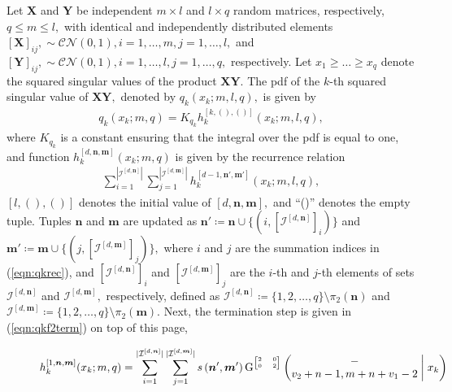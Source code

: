 \begin{theorem}
	\label{thm:qk}
	Let $\boldsymbol{X}$ and $\boldsymbol{Y}$ be independent $m\times l$ and $l\times q$ random matrices, respectively, $q \leq m \leq l,$ with identical and independently distributed elements $[\boldsymbol{X}]_{ij}, \sim \mathcal{CN}(0,1), i=1,\dots,m,j=1,\dots,l,$ and $[\boldsymbol{Y}]_{ij}, \sim \mathcal{CN}(0,1), i=1,\dots,l,j=1,\dots,q,$ respectively. Let $x_1 \geq \dots \geq x_q$ denote the squared singular values of the product $\boldsymbol{X}\boldsymbol{Y}.$ The pdf of the $k$-th squared singular value of $\boldsymbol{X}\boldsymbol{Y},$ denoted by $q_k(x_k; m, l, q),$ is given by
	\begin{align}
		q_k(x_k; m, q) = K_{q_k} h^{[k,(),()]}_k(x_k; m, l, q),
	\end{align}
	where $K_{q_k}$ is a constant ensuring that the integral over the pdf is equal to one, and function $h^{[d,\boldsymbol{n},\boldsymbol{m}]}_k(x_k; m, q)$ is given by the recurrence relation
	\begin{align}
		\sum_{i = 1}^{|{\mathcal{I}}^{[d,\boldsymbol{n}]}|} \sum_{j = 1}^{|{\mathcal{I}}^{[d,\boldsymbol{m}]}|} h^{[d-1,\boldsymbol{n}',\boldsymbol{m}']}_k(x_k; m,l,q), \label{eqn:qkrec}
	\end{align}
	$[l,(),()]$ denotes the initial value of $[d,\boldsymbol{n},\boldsymbol{m}],$ and ``()'' denotes the empty tuple. Tuples $\boldsymbol{n}$ and $\boldsymbol{m}$ are updated as $\boldsymbol{n}' \coloneqq \boldsymbol{n} \cup \{(i,[{\mathcal{I}}^{[d,\boldsymbol{n}]}]_i)\}$ and $\boldsymbol{m}' \coloneqq \boldsymbol{m} \cup \{(j,[{\mathcal{I}}^{[d,\boldsymbol{m}]}]_j)\},$ where $i$ and $j$ are the summation indices in (\ref{eqn:qkrec}), and $[{\mathcal{I}}^{[d,\boldsymbol{n}]}]_i$ and $[{\mathcal{I}}^{[d,\boldsymbol{m}]}]_j$ are the $i$-th and $j$-th elements of sets ${\mathcal{I}}^{[d, \boldsymbol{n}]}$ and ${\mathcal{I}}^{[d, \boldsymbol{m}]},$ respectively, defined as ${\mathcal{I}}^{[d,\boldsymbol{n}]} \coloneqq \{1,2,\dots,q\} \setminus \pi_2(\boldsymbol{n})$ and ${\mathcal{I}}^{[d,\boldsymbol{m}]} \coloneqq \{1,2,\dots,q\} \setminus \pi_2(\boldsymbol{m}).$ Next, the termination step is given in (\ref{eqn:qkf2term}) on top of this page,
	\begin{figure*}
		\begin{align}
			h^{[1,\boldsymbol{n},\boldsymbol{m}]}_k(x_k; m, q) &= \sum_{i = 1}^{|{\mathcal{I}}^{[d,\boldsymbol{n}]}|} \sum_{j = 1}^{|{\mathcal{I}}^{[d,\boldsymbol{m}]}|} s\left(\boldsymbol{n}',\boldsymbol{m}'\right)
			\G{2}{0}{0}{2}{-}{v_2+n-1, m+n+v_1-2}{x_k} \nonumber\\

\end{align}
\end{figure*}
\end{theorem}
